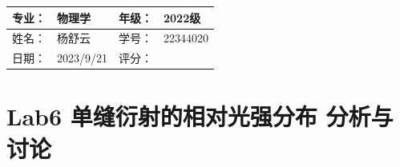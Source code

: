\documentclass[dvipsnames, svgnames,a4paper,11pt]{article}
\begin{document}
	
	
	\clearpage
	\begin{table}
		\renewcommand\arraystretch{1.7}
		\begin{tabularx}{\textwidth}{|X|X|X|X|}
			\hline
			专业：& 物理学 &年级：& 2022级\\
			\hline
			姓名： & 杨舒云 & 学号：& 22344020\\
			\hline
			日期：& 2023/9/21 & 评分： &\\
			\hline
		\end{tabularx}
	\end{table}
	
	\section{Lab6 单缝衍射的相对光强分布 \quad\heiti 分析与讨论}
\end{document}
